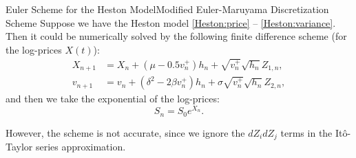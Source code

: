 \begin{frame}{Euler Scheme for the Heston Model}{Modified Euler-Maruyama Discretization Scheme}
    Suppose we have the Heston model \eqref{Heston:price} -- \eqref{Heston:variance}. Then it could be numerically solved by the following finite difference scheme (for the log-prices $X(t)$):
    \begin{align}
        X_{n+1} & = X_n + (\mu - 0.5 v_n^+)h_n + \sqrt{v_n^+} \sqrt{h_n} Z_{1,n}, \label{Euler:Heston:price:posmod}\\
        v_{n+1} & = v_n + \left(\delta^2 - 2\beta v_n^+\right) h_n + \sigma \sqrt{v_n^+} \sqrt{h_n} Z_{2,n}, \label{Euler:Heston:variance:posmod}
    \end{align}
    and then we take the exponential of the log-prices:
    \begin{equation}
        S_{n} = S_0 e^{X_{n}}.
    \end{equation}
    
    However, the scheme is not accurate, since we ignore the $dZ_idZ_j$ terms in the It\^o-Taylor series approximation.
\end{frame}